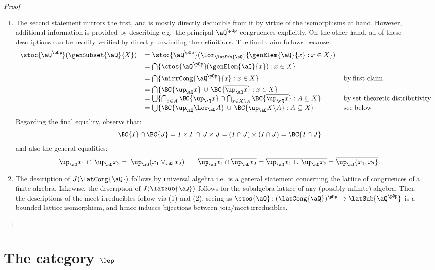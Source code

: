 \documentclass{article}
\begin{document}
\begin{proof}
\begin{enumerate}
\item
The second statement mirrors the first, and is mostly directly deducible from it by virtue of the isomorphisms at hand. However, additional information is provided by describing e.g.\ the principal $\aQ^{\pOp}$-congruences explicitly. On the other hand, all of these descriptions can be readily verified by directly unwinding the definitions. The final claim follows because:
\[
\begin{tabular}{lll}
$\stoc{\aQ^{\pOp}}(\genSubset{\aQ}{X})$
&
$= \stoc{\aQ^{\pOp}}(\Lor_{\latSub{\aQ}} \{ \genElem{\aQ}{x} : x \in X  \})$
& 
\\[1ex]&
$= \bigcap \{ \ctos{\aQ^{\pOp}}(\genElem{\aQ}{x}) : x \in X \}$
\\[1ex]&
$= \bigcap \{ \mirrCong{\aQ^{\pOp}}{x} : x \in X \}$
& by first claim
\\[1ex]&
$= \bigcap \{ \BC{\up_\aQ x} \,\cup\, \BC{\overline{\up_\aQ x}} : x \in X  \}$
\\&
$= \bigcup \{ \bigcap_{x \in A} \BC{\up_\aQ x} \cap \bigcap_{x \in X\backslash A} \BC{\overline{\up_\aQ x}} : A \subseteq X \}$
& by set-theoretic distributivity
\\&
$= \bigcup \{ \BC{\up_\aQ \Lor_\aQ A} \,\cup\, \overline{\BC{\up_\aQ X\backslash A}} : A \subseteq X \}$
& see below
\end{tabular}
\]
Regarding the final equality, observe that:
\[
\BC{I} \cap \BC{J} = I \times I \,\cap\, J \times J = (I \cap J) \times (I \cap J) = \BC{I \cap J}
\]
and also the general equalities:
\[
\up_\aQ x_1 \,\cap\, \up_\aQ x_2 = \; \up_\aQ (x_1 \lor_\aQ x_2)
\qquad
\overline{\up_\aQ x_1} \cap \overline{\up_\aQ x_2} = \overline{\up_\aQ x_1 \,\cup\, \up_\aQ x_2} = \overline{\up_\aQ \{x_1,x_2\}}.
\]

\item
The description of $J(\latCong{\aQ})$ follows by universal algebra i.e.\ is a general statement concerning the lattice of congruences of a finite algebra. Likewise, the description of $J(\latSub{\aQ})$ follows for the subalgebra lattice of any (possibly infinite) algebra. Then the descriptions of the meet-irreducibles follow via (1) and (2), seeing as $\ctos{\aQ} : (\latCong{\aQ})^{\pOp} \to \latSub{\aQ^{\pOp}}$ is a bounded lattice isomorphism, and hence induces bijections between join/meet-irreducibles.

\end{enumerate}
\end{proof}


\section{The category $\Dep$}
\label{sec:the_cat_dep}
\end{document}
